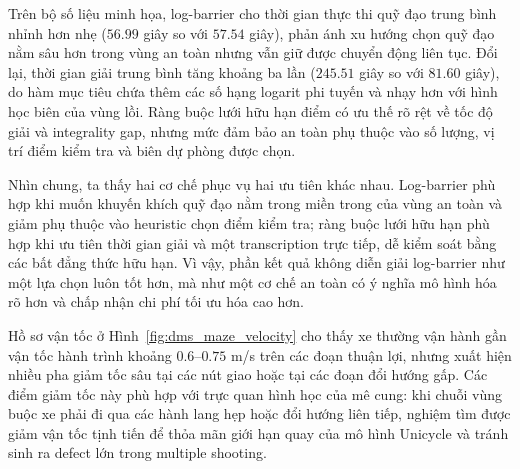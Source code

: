 Trên bộ số liệu minh họa, log-barrier cho thời gian thực thi quỹ đạo trung bình nhỉnh hơn nhẹ ($56.99$ giây so với $57.54$ giây), phản ánh xu hướng chọn quỹ đạo nằm sâu hơn trong vùng an toàn nhưng vẫn giữ được chuyển động liên tục. Đổi lại, thời gian giải trung bình tăng khoảng ba lần ($245.51$ giây so với $81.60$ giây), do hàm mục tiêu chứa thêm các số hạng logarit phi tuyến và nhạy hơn với hình học biên của vùng lồi. Ràng buộc lưới hữu hạn điểm có ưu thế rõ rệt về tốc độ giải và integrality gap, nhưng mức đảm bảo an toàn phụ thuộc vào số lượng, vị trí điểm kiểm tra và biên dự phòng được chọn.

Nhìn chung, ta thấy hai cơ chế phục vụ hai ưu tiên khác nhau. Log-barrier phù hợp khi muốn khuyến khích quỹ đạo nằm trong miền trong của vùng an toàn và giảm phụ thuộc vào heuristic chọn điểm kiểm tra; ràng buộc lưới hữu hạn phù hợp khi ưu tiên thời gian giải và một transcription trực tiếp, dễ kiểm soát bằng các bất đẳng thức hữu hạn. Vì vậy, phần kết quả không diễn giải log-barrier như một lựa chọn luôn tốt hơn, mà như một cơ chế an toàn có ý nghĩa mô hình hóa rõ hơn và chấp nhận chi phí tối ưu hóa cao hơn.

Hồ sơ vận tốc ở Hình~\ref{fig:dms_maze_velocity} cho thấy xe thường vận hành gần vận tốc hành trình khoảng $0.6$--$0.75$ m/s trên các đoạn thuận lợi, nhưng xuất hiện nhiều pha giảm tốc sâu tại các nút giao hoặc tại các đoạn đổi hướng gấp. Các điểm giảm tốc này phù hợp với trực quan hình học của mê cung: khi chuỗi vùng buộc xe phải đi qua các hành lang hẹp hoặc đổi hướng liên tiếp, nghiệm tìm được giảm vận tốc tịnh tiến để thỏa mãn giới hạn quay của mô hình Unicycle và tránh sinh ra defect lớn trong multiple shooting.

